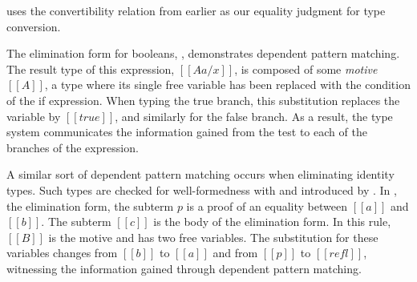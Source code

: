 \documentclass[acmsmall,screen=true,
\ifpublic review=false\else,review=true\fi
  ,anonymous=\ifanonymous true\else false\fi]{acmart}
\newcommand{\yl}[1]{}
\begin{document}


 uses the convertibility relation from earlier
as our equality judgment for type conversion.

The elimination form for booleans, , demonstrates dependent pattern
matching.  The result type of this expression, $[[A {a / x}]]$, is composed of some
\emph{motive} $[[A]]$, a type where its single free variable has been replaced
with the condition of the if expression. When typing the true branch, this
substitution replaces the variable by $[[true]]$, and similarly for the false
branch. As a result, the type system communicates the information gained from
the %
test to each of the branches of the expression.

A similar sort of dependent pattern matching occurs when eliminating identity
types. Such types are checked for well-formedness with  and
introduced by . In , the elimination form, the subterm
$p$ is a proof of an equality between $[[a]]$ and $[[b]]$. The subterm $[[c]]$
is the body of the elimination form. In this rule, $[[B]]$ is the motive and has two free variables.  The substitution for these
variables changes from $[[b]]$ to $[[a]]$ and from $[[p]]$ to $[[refl]]$,
witnessing the information gained through dependent pattern matching. 
\end{document}
